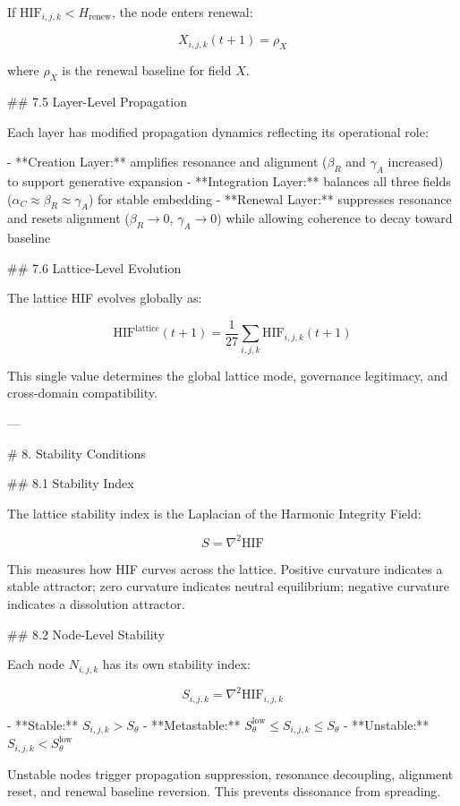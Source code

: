 If \(\mathrm{HIF}_{i,j,k} < H_{\text{renew}}\), the node enters renewal:

\[
X_{i,j,k}(t+1) = \rho_X
\]

where \(\rho_X\) is the renewal baseline for field \(X\).

## 7.5 Layer-Level Propagation

Each layer has modified propagation dynamics reflecting its operational role:

- **Creation Layer:** amplifies resonance and alignment (\(\beta_R\) and \(\gamma_A\)
  increased) to support generative expansion
- **Integration Layer:** balances all three fields (\(\alpha_C \approx \beta_R
  \approx \gamma_A\)) for stable embedding
- **Renewal Layer:** suppresses resonance and resets alignment (\(\beta_R
  \rightarrow 0\), \(\gamma_A \rightarrow 0\)) while allowing coherence to decay
  toward baseline

## 7.6 Lattice-Level Evolution

The lattice HIF evolves globally as:

\[
\mathrm{HIF}^{\text{lattice}}(t+1) = \frac{1}{27} \sum_{i,j,k}
\mathrm{HIF}_{i,j,k}(t+1)
\]

This single value determines the global lattice mode, governance legitimacy, and
cross-domain compatibility.

---

# 8. Stability Conditions

## 8.1 Stability Index

The lattice stability index is the Laplacian of the Harmonic Integrity Field:

\[
S = \nabla^2 \mathrm{HIF}
\]

This measures how HIF curves across the lattice. Positive curvature indicates a
stable attractor; zero curvature indicates neutral equilibrium; negative curvature
indicates a dissolution attractor.

## 8.2 Node-Level Stability

Each node \(N_{i,j,k}\) has its own stability index:

\[
S_{i,j,k} = \nabla^2 \mathrm{HIF}_{i,j,k}
\]

- **Stable:** \(S_{i,j,k} > S_{\theta}\)
- **Metastable:** \(S_{\theta}^{\text{low}} \le S_{i,j,k} \le S_{\theta}\)
- **Unstable:** \(S_{i,j,k} < S_{\theta}^{\text{low}}\)

Unstable nodes trigger propagation suppression, resonance decoupling, alignment
reset, and renewal baseline reversion. This prevents dissonance from spreading.

